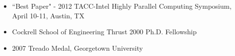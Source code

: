 \vspace{-0.3in}

\begin{itemize}
	\itemsep 0pt
	\item ``Best Paper" - 2012 TACC-Intel Highly Parallel Computing Symposium, April 10-11, Austin, TX
        \item Cockrell School of Engineering Thrust 2000 Ph.D. Fellowship
        \item 2007 Treado Medal, Georgetown University      
\end{itemize}


